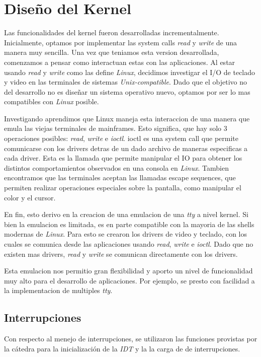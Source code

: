 \documentclass[a4paper,10pt]{article}
\begin{document}
\newpage
\section{Diseño del Kernel}
    Las funcionalidades del kernel fueron desarrolladas incrementalmente.
    Inicialmente, optamos por implementar las system calls \textit{read} y \textit{write} de una manera muy sencilla.
    Una vez que teniamos esta version desarrollada, comenzamos a pensar como interactuan estas con las aplicaciones.
    Al estar usando \textit{read} y \textit{write} como las define \textit{Linux}, decidimos investigar el I/O de teclado y video en las terminales de sistemas \textit{Unix-compatible}.
    Dado que el objetivo no del desarrollo no es diseñar un sistema operativo nuevo, optamos por ser lo mas compatibles con \textit{Linux} posible.

    Investigando aprendimos que Linux maneja esta interaccion de una manera que emula las viejas terminales de mainframes.
    Esto significa, que hay solo 3 operaciones posibles: \textit{read}, \textit{write} e \textit{ioctl}.
    ioctl es una system call que permite comunicarse con los drivers detras de un dado archivo de maneras especificas a cada driver.
    Esta es la llamada que permite manipular el IO para obtener los distintos comportamientos observados en una consola en \textit{Linux}.
    Tambien encontramos que las terminales aceptan las llamadas escape sequences, que permiten realizar operaciones especiales sobre la pantalla, como manipular el color y el cursor.

    En fin, esto derivo en la creacion de una emulacion de una \textit{tty} a nivel kernel.
    Si bien la emulacion es limitada, es en parte compatible con la mayoria de las shells modernas de \textit{Linux}.
    Para esto se crearon los drivers de video y teclado, con los cuales se comunica desde las aplicaciones usando \textit{read}, \textit{write} e \textit{ioctl}.
    Dado que no existen mas drivers, \textit{read} y \textit{write} se comunican directamente con los drivers.

    Esta emulacion nos permitio gran flexibilidad y aporto un nivel de funcionalidad muy alto para el desarrollo de aplicaciones.
    Por ejemplo, se presto con facilidad a la implementacion de multiples \textit{tty}.

    \subsection{Interrupciones}
        Con respecto al menejo de interrupciones, se utilizaron las funciones provistas por la cátedra para la inicialización de la \textit{IDT} y la
        la carga de de interrupciones.
\end{document}
